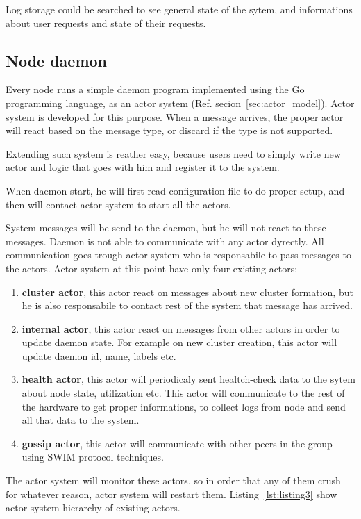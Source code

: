 Log storage could be searched to see general state of the sytem, and informations about user requests and state of their requests.
%
%
\subsection{Node daemon}\label{sec:node_daemon}
Every node runs a simple daemon program implemented using the Go programming language, as an actor system (Ref. secion~\ref{sec:actor_model}). Actor system is developed for this purpose. When a message arrives, the proper actor will react based on the message type, or discard if the type is not supported. 

Extending such system is reather easy, because users need to simply write new actor and logic that goes with him and register it to the system.

When daemon start, he will first read configuration file to do proper setup, and then will contact actor system to start all the actors. 

System messages will be send to the daemon, but he will not react to these messages. Daemon is not able to communicate with any actor dyrectly. All communication goes trough actor system who is responsabile to pass messages to the actors. Actor system at this point have only four existing actors:

\begin{enumerate}[start=1,label={(\bfseries \arabic*)}]
	\item \textbf{cluster actor}, this actor react on messages about new cluster formation, but he is also responsabile to contact rest of the system that message has arrived.
	\item \textbf{internal actor}, this actor react on messages from other actors in order to update daemon state. For example on new cluster creation, this actor will update daemon id, name, labels etc.
	\item \textbf{health actor}, this actor will periodicaly sent healtch-check data to the sytem about node state, utilization etc. This actor will communicate to the rest of the hardware to get proper informations, to collect logs from node and send all that data to the system.
	\item \textbf{gossip actor}, this actor will communicate with other peers in the group using SWIM protocol techniques.
\end{enumerate}

The actor system will monitor these actors, so in order that any of them crush for whatever reason, actor system will restart them. Listing~\ref{lst:listing3} show actor system hierarchy of existing actors.

